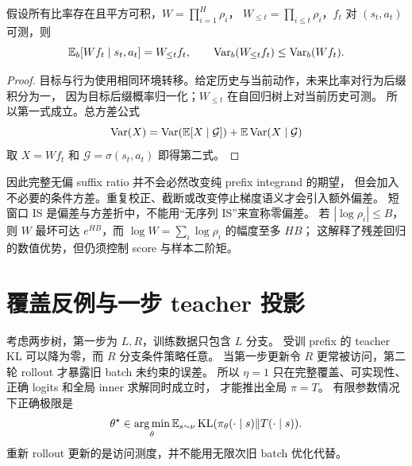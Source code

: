 \begin{theorem}[历史校正的条件方差优势]
假设所有比率存在且平方可积，$W=\prod_{i=1}^{H}\rho_i$，
$W_{\le t}=\prod_{i\le t}\rho_i$，$f_t$ 对 $(s_t,a_t)$ 可测，则
\[
 \mathbb{E}_b[Wf_t\mid s_t,a_t]=W_{\le t}f_t,\qquad
 \operatorname{Var}_b(W_{\le t}f_t)\le\operatorname{Var}_b(Wf_t).
\]
\end{theorem}
\begin{proof}
目标与行为使用相同环境转移。给定历史与当前动作，未来比率对行为后缀积分为一，
因为目标后缀概率归一化；$W_{\le t}$ 在自回归树上对当前历史可测。
所以第一式成立。总方差公式
\[
 \operatorname{Var}(X)=\operatorname{Var}(\mathbb{E}[X\mid\mathcal G])+\mathbb{E}\operatorname{Var}(X\mid\mathcal G)
\]
取 $X=Wf_t$ 和 $\mathcal G=\sigma(s_t,a_t)$ 即得第二式。
\end{proof}
因此完整无偏 suffix ratio 并不会必然改变纯 prefix integrand 的期望，
但会加入不必要的条件方差。重复校正、截断或改变停止梯度语义才会引入额外偏差。
短窗口 IS 是偏差与方差折中，不能用“无序列 IS”来宣称零偏差。
若 $|\log\rho_i|\le B$，则 $W$ 最坏可达 $e^{HB}$，而
$\log W=\sum_i\log\rho_i$ 的幅度至多 $HB$；
这解释了残差回归的数值优势，但仍须控制 score 与样本二阶矩。

\section{覆盖反例与一步 teacher 投影}
考虑两步树，第一步为 $L,R$，训练数据只包含 $L$ 分支。
受训 prefix 的 teacher KL 可以降为零，而 $R$ 分支条件策略任意。
当第一步更新令 $R$ 更常被访问，第二轮 rollout 才暴露旧 batch 未约束的误差。
所以 $\eta=1$ 只在完整覆盖、可实现性、正确 logits 和全局 inner 求解同时成立时，
才能推出全局 $\pi=T$。
有限参数情况下正确极限是
\[
 \theta^\star\in\operatorname*{arg\,min}_\theta\mathbb{E}_{s\sim\nu}
          \operatorname{KL}(\pi_\theta(\cdot\mid s)\Vert T(\cdot\mid s)).
\]
重新 rollout 更新的是访问测度，并不能用无限次旧 batch 优化代替。

